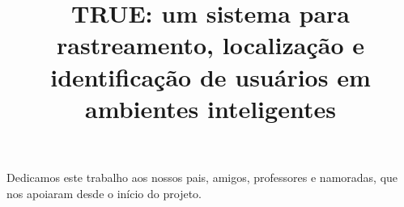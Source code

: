 \documentclass[bacharelado]{unb-cic}
\title{TRUE: um sistema para rastreamento, localização e identificação de usuários em ambientes inteligentes}
\begin{document}
\maketitle
\pretextual
\begin{dedicatoria}
	Dedicamos este trabalho aos nossos pais, amigos, professores e namoradas, que nos apoiaram desde o início do projeto.
\end{dedicatoria}









\tableofcontents
\listoffigures
\listoftables

\textual






% 




\postextual




\end{document}
